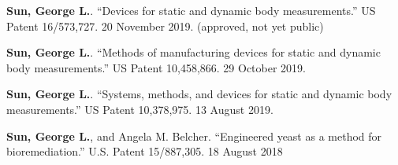 
\begin{cvparagraph}
\textbf{Sun, George L.}. ``Devices for static and dynamic body measurements.'' US Patent 16/573,727. 20 November 2019. (approved, not yet public)

\textbf{Sun, George L.}. ``Methods of manufacturing devices for static and dynamic body measurements.'' US Patent 10,458,866. 29 October 2019.

\textbf{Sun, George L.}. ``Systems, methods, and devices for static and dynamic body measurements.'' US Patent 10,378,975. 13 August 2019.

\textbf{Sun, George L.}, and Angela M. Belcher. ``Engineered yeast as a method for bioremediation.'' U.S. Patent 15/887,305. 18 August 2018

\end{cvparagraph}
